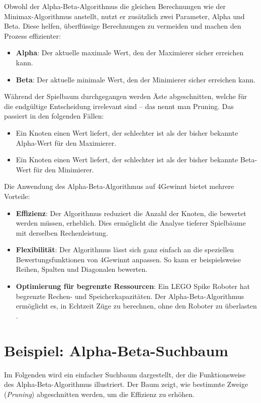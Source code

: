 Obwohl der Alpha-Beta-Algorithmus die gleichen Berechnungen wie der Minimax-Algorithmus anstellt, nutzt er zusätzlich zwei Parameter, Alpha und Beta. Diese helfen, überflüssige Berechnungen zu vermeiden und machen den Prozess effizienter:

\begin{itemize}
	\item \textbf{Alpha}: Der aktuelle maximale Wert, den der Maximierer sicher erreichen kann.
	\item \textbf{Beta}: Der aktuelle minimale Wert, den der Minimierer sicher erreichen kann.
\end{itemize}

Während der Spielbaum durchgegangen werden Äste abgeschnitten, welche für die endgültige Entscheidung irrelevant sind – das nennt man Pruning. Das passiert in den folgenden Fällen:
\begin{itemize}
	\item Ein Knoten einen Wert liefert, der schlechter ist als der bisher bekannte Alpha-Wert für den Maximierer.
	\item Ein Knoten einen Wert liefert, der schlechter ist als der bisher bekannte Beta-Wert für den Minimierer.
\end{itemize}

Die Anwendung des Alpha-Beta-Algorithmus auf 4Gewinnt bietet mehrere Vorteile:
\begin{itemize}
	\item \textbf{Effizienz}: Der Algorithmus reduziert die Anzahl der Knoten, die bewertet werden müssen, erheblich. Dies ermöglicht die Analyse tieferer Spielbäume mit derselben Rechenleistung.
	\item \textbf{Flexibilität}: Der Algorithmus lässt sich ganz einfach an die speziellen Bewertungsfunktionen von 4Gewinnt anpassen. So kann er beispielsweise Reihen, Spalten und Diagonalen bewerten.
	\item \textbf{Optimierung für begrenzte Ressourcen}: Ein LEGO Spike Roboter hat begrenzte Rechen- und Speicherkapazitäten. Der Alpha-Beta-Algorithmus ermöglicht es, in Echtzeit Züge zu berechnen, ohne den Roboter zu überlasten \autocites{monien_alphabeta-algorithmus_2008}.
\end{itemize}

\section*{Beispiel: Alpha-Beta-Suchbaum}

Im Folgenden wird ein einfacher Suchbaum dargestellt, der die Funktionsweise des Alpha-Beta-Algorithmus illustriert. Der Baum zeigt, wie bestimmte Zweige (\textit{Pruning}) abgeschnitten werden, um die Effizienz zu erhöhen.

